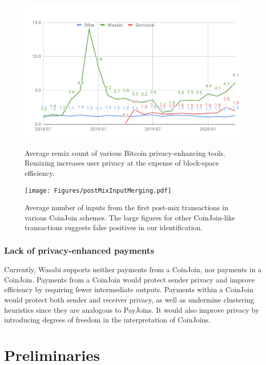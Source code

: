 \documentclass[a4paper]{article}
\begin{document}
\begin{figure}%
\centering
\begin{minipage}{.45\textwidth}
    \centering
    \includegraphics[width=\linewidth]{Figures/avgRemixCount.pdf}
    \caption{Average remix count of various Bitcoin privacy-enhancing tools. Remixing increases user privacy at the expense of block-space efficiency. }
    \label{fig:remixcount}
\end{minipage}
\hspace{6pt}
\begin{minipage}{.45\textwidth}
    \centering
    \texttt{[image: Figures/postMixInputMerging.pdf]}
    \caption{Average number of inputs from the first post-mix transactions in various CoinJoin schemes. The large figures for other CoinJoin-like transactions suggests false positives in our identification.}
    \label{fig:postmixmerging}
\end{minipage}
\end{figure}

\subsubsection{Lack of privacy-enhanced payments} Currently, Wasabi supports neither payments from a CoinJoin, nor payments in a CoinJoin. Payments from a CoinJoin would protect sender privacy and improve efficiency by requiring fewer intermediate outputs. Payments within a CoinJoin would protect both sender and receiver privacy, as well as undermine clustering heuristics since they are analogous to PayJoins. It would also improve privacy by introducing degrees of freedom in the interpretation of CoinJoins.




\section{Preliminaries}\label{sec:preliminaries}
\end{document}
